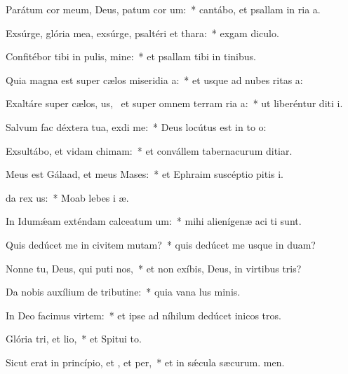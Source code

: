 \item Parátum cor meum, Deus, patum cor um:~* cantábo, et psallam in ria a.
\item Exsúrge, glória mea, exsúrge, psaltéri et thara:~* exgam diculo.
\item Confitébor tibi in pulis, mine:~* et psallam tibi in tinibus.
\item Quia magna est super cælos miseridia a:~* et usque ad nubes ritas a:
\item Exaltáre super cælos, us,~\pscross{} et super omnem terram ria a:~* ut liberéntur diti i.
\item Salvum fac déxtera tua,  exdi me:~* Deus locútus est in to o:
\item Exsultábo, et vidam chimam:~* et convállem tabernacurum ditiar.
\item Meus est Gálaad, et meus  Mases:~* et Ephraim suscéptio pitis i.
\item {}da rex us:~* Moab lebes i æ.
\item In Idumǽam exténdam calceatum um:~* mihi alienígenæ aci ti sunt.
\item Quis dedúcet me in civitem mutam?~* quis dedúcet me usque in duam?
\item Nonne tu, Deus, qui puti nos,~* et non exíbis, Deus, in virtibus tris?
\item Da nobis auxílium de tributine:~* quia vana lus minis.
\item In Deo facimus virtem:~* et ipse ad níhilum dedúcet inicos tros.
\item Glória tri, et lio,~* et Spitui to.
\item Sicut erat in princípio, et , et per,~* et in sǽcula sæcurum. men.
